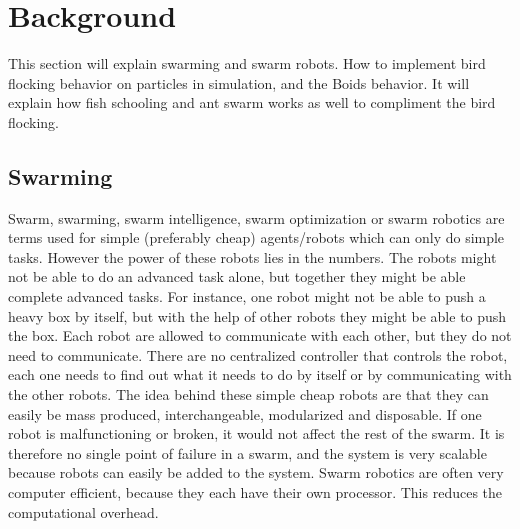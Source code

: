 \section{Background}
\label{chap:background}
This section will explain swarming and swarm robots. How to implement bird flocking behavior on particles in simulation, and the Boids behavior. It will explain how fish schooling and ant swarm works as well to compliment the bird flocking.

\subsection{Swarming}
Swarm, swarming, swarm intelligence, swarm optimization or swarm robotics are terms used for simple (preferably cheap) agents/robots which can only do simple tasks. However the power of these robots lies in the numbers. The robots might not be able to do an advanced task alone, but together they might be able complete advanced tasks. For instance, one robot might not be able to push a heavy box by itself, but with the help of other robots they might be able to push the box.
Each robot are allowed to communicate with each other, but they do not need to communicate. There are no centralized controller that controls the robot, each one needs to find out what it needs to do by itself or by communicating with the other robots. The idea behind these simple cheap robots are that they can easily be mass produced, interchangeable, modularized and disposable. If one robot is malfunctioning or broken, it would not affect the rest of the swarm. It is therefore no single point of failure in a swarm, and the system is very scalable because robots can easily be added to the system.
Swarm robotics are often very computer efficient, because they each have their own processor. This reduces the computational overhead. 

